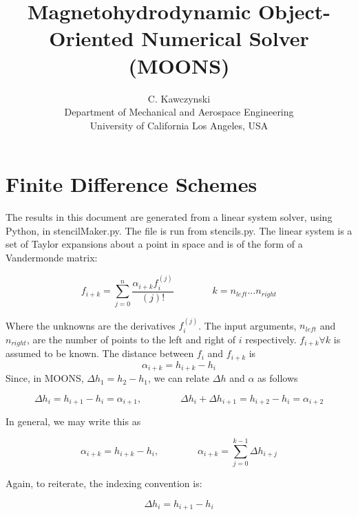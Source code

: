 \documentclass[landscape]{article}
\begin{document}
\doublespacing
\title{Magnetohydrodynamic Object-Oriented Numerical Solver (MOONS)}
\author{C. Kawczynski \\
Department of Mechanical and Aerospace Engineering \\
University of California Los Angeles, USA\\}
\maketitle

\section{Finite Difference Schemes}

The results in this document are generated from a linear system solver, using Python, in stencilMaker.py. The file is run from stencils.py. The linear system is a set of Taylor expansions about a point in space and is of the form of a Vandermonde matrix:

\begin{equation}
	f_{i+k}
	=
	\sum_{j=0}^n
	\frac{\alpha_{i+k} f_{i}^{(j)}}{(j)!}
	\qquad \qquad
	k = n_{left} \dots n_{right}
\end{equation}

Where the unknowns are the derivatives $f_i^{(j)}$. The input arguments, $n_{left}$ and $n_{right}$, are the number of points to the left and right of $i$ respectively. $f_{i+k}\forall k$ is assumed to be known. The distance between $f_{i}$ and $f_{i+k}$ is
\begin{equation}
	\alpha_{i+k}
	=
	h_{i+k} - h_{i}
\end{equation}
Since, in MOONS, $\Delta h_1 = h_2 - h_1$, we can relate $\Delta h$ and $\alpha$ as follows

\begin{equation}
	\Delta h_{i} = h_{i+1} - h_{i} = \alpha_{i+1}
	,\qquad \qquad
	\Delta h_{i} + \Delta h_{i+1} = h_{i+2} - h_{i} = \alpha_{i+2}
\end{equation}

In general, we may write this as

\begin{equation}
	\alpha_{i+k} = h_{i+k} - h_{i}
	,\qquad \qquad
	\alpha_{i+k} = \sum_{j=0}^{k-1} \Delta h_{i+j}
\end{equation}

Again, to reiterate, the indexing convention is:

\begin{equation}
	\boxed{
	\Delta h_{i}
	=
	h_{i+1} - h_{i}
	}
\end{equation}
\end{document}
